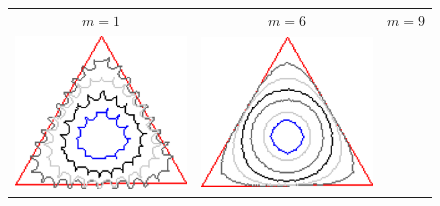 \begin{figure}
\center
\begin{tabular}{ccc}
$m=1$ & $m=6$ & $m=9$\\
\includegraphics[scale=0.22]{figures/chapter6/level-effect/triangle/improve/len_pen0/radius-9/level1/summary.pdf} &
\includegraphics[scale=0.22]{figures/chapter6/level-effect/triangle/improve/len_pen0/radius-9/level6/summary.pdf} &

\end{tabular}
\end{figure}
